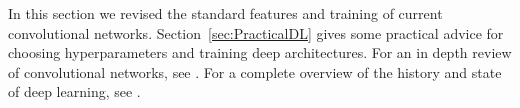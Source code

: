 In this section we revised the standard features and training of current convolutional networks. Section~\ref{sec:PracticalDL} gives some practical advice for choosing hyperparameters and training deep architectures. For an in depth review of convolutional networks, see \cite{Karpathy2015}. For a complete overview of the history and state of deep learning, see \cite{Schmidhuber2015}.
